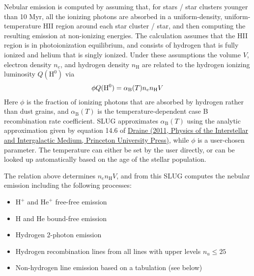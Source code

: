 \documentclass[letterpaper,10pt,english]{sphinxmanual}
\begin{document}
Nebular emission is computed by assuming that, for stars / star clusters younger than 10 Myr, all the ionizing photons are absorbed in a uniform-density, uniform-temperature HII region around each star cluster / star, and then computing the resulting emission at non-ionizing energies. The calculation assumes that the HII region is in photoionization equilibrium, and consists of hydrogen that is fully ionized and helium that is singly ionized. Under these assumptions the volume \(V\), electron density \(n_e\), and hydrogen density \(n_{\mathrm{H}}\) are related to the hydrogen ionizing luminosity \(Q(\mathrm{H}^0)\) via
\begin{gather}
\begin{split}\phi Q(\mathrm{H}^0) = \alpha_{\mathrm{B}}(T) n_e n_{\mathrm{H}} V\end{split}\notag
\end{gather}
Here \(\phi\) is the fraction of ionizing photons that are absorbed by hydrogen rather than dust grains, and \(\alpha_{\mathrm{B}}(T)\) is the temperature-dependent case B recombination rate coefficient. SLUG approximates \(\alpha_{\mathrm{B}}(T)\) using the analytic approximation given by equation 14.6 of \href{http://adsabs.harvard.edu/abs/2011piim.book.....D}{Draine (2011, Physics of the Interstellar and Intergalactic Medium, Princeton University Press)}, while \(\phi\) is a user-chosen parameter. The temperature can either be set by the user directly, or can be looked up automatically based on the age of the stellar population.

The relation above determines \(n_e n_{\mathrm{H}} V\), and from this SLUG computes the nebular emission including the following processes:
\begin{itemize}
\item {} 
\(\mathrm{H}^+\) and \(\mathrm{He}^+\) free-free emission

\item {} 
\(\mathrm{H}\) and \(\mathrm{He}\) bound-free emission

\item {} 
Hydrogen 2-photon emission

\item {} 
Hydrogen recombination lines from all lines with upper levels \(n_u \leq 25\)

\item {} 
Non-hydrogen line emission based on a tabulation (see below)

\end{itemize}
\end{document}
